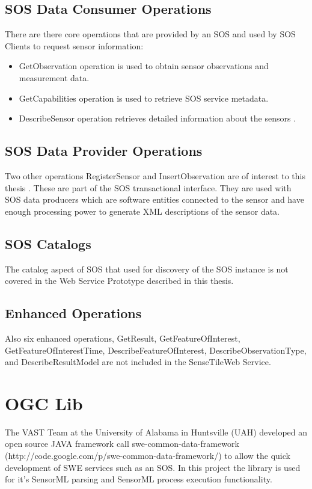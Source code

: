 \documentclass[]{final_report}
\begin{document}
\subsection{SOS Data Consumer Operations}
There are there core operations that are provided by an SOS and used by SOS Clients to request sensor information:
 \begin{itemize}
\item GetObservation operation is used to obtain sensor observations and measurement data.
\item GetCapabilities operation is used to retrieve SOS service metadata.
\item DescribeSensor operation retrieves detailed information about the sensors .
\end{itemize}

\subsection{SOS Data Provider Operations}
Two other operations RegisterSensor and InsertObservation are of interest to this thesis . These are part of the SOS transactional interface. They are used with SOS data producers which are software entities connected to the sensor and have enough processing power to generate XML descriptions of the sensor data.

\subsection{SOS Catalogs}
The catalog aspect of SOS that used for discovery of the SOS instance is not covered in the Web Service Prototype described in this thesis. 
\subsection{Enhanced Operations}
Also six enhanced operations, GetResult,
GetFeatureOfInterest, GetFeatureOfInterestTime, DescribeFeatureOfInterest,
DescribeObservationType, and DescribeResultModel are not included in the SenseTileWeb Service.

\section{OGC Lib}
The VAST Team at the University of Alabama in Huntsville (UAH)  developed an open source JAVA framework call swe-common-data-framework (http://code.google.com/p/swe-common-data-framework/) to allow the quick development of SWE services such as an SOS. In this project the library is used for it's SensorML parsing and SensorML process execution functionality.
\end{document}
